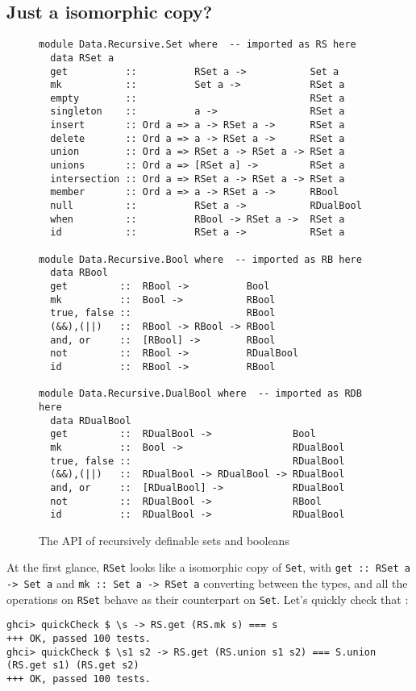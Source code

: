 \documentclass[manuscript,screen,acmsmall]{acmart}
\begin{document}
\subsection{Just a isomorphic copy?}

\begin{figure}
\begin{verbatim}
module Data.Recursive.Set where  -- imported as RS here
  data RSet a
  get          ::          RSet a ->           Set a
  mk           ::          Set a ->            RSet a
  empty        ::                              RSet a
  singleton    ::          a ->                RSet a
  insert       :: Ord a => a -> RSet a ->      RSet a
  delete       :: Ord a => a -> RSet a ->      RSet a
  union        :: Ord a => RSet a -> RSet a -> RSet a
  unions       :: Ord a => [RSet a] ->         RSet a
  intersection :: Ord a => RSet a -> RSet a -> RSet a
  member       :: Ord a => a -> RSet a ->      RBool
  null         ::          RSet a ->           RDualBool
  when         ::          RBool -> RSet a ->  RSet a
  id           ::          RSet a ->           RSet a

module Data.Recursive.Bool where  -- imported as RB here
  data RBool
  get         ::  RBool ->          Bool
  mk          ::  Bool ->           RBool
  true, false ::                    RBool
  (&&),(||)   ::  RBool -> RBool -> RBool
  and, or     ::  [RBool] ->        RBool
  not         ::  RBool ->          RDualBool
  id          ::  RBool ->          RBool

module Data.Recursive.DualBool where  -- imported as RDB here
  data RDualBool
  get         ::  RDualBool ->              Bool
  mk          ::  Bool ->                   RDualBool
  true, false ::                            RDualBool
  (&&),(||)   ::  RDualBool -> RDualBool -> RDualBool
  and, or     ::  [RDualBool] ->            RDualBool
  not         ::  RDualBool ->              RBool
  id          ::  RDualBool ->              RDualBool
\end{verbatim}
\caption{The API of recursively definable sets and booleans}\label{fig:api}
\end{figure}

At the first glance, \verb|RSet| looks like a isomorphic copy of \verb|Set|, with \verb|get :: RSet a -> Set a| and \verb|mk :: Set a -> RSet a| converting between the types, and all the operations on \verb|RSet| behave as their counterpart on \verb|Set|. Let's quickly check that \citep{quickcheck}:
\begin{verbatim}
ghci> quickCheck $ \s -> RS.get (RS.mk s) === s
+++ OK, passed 100 tests.
ghci> quickCheck $ \s1 s2 -> RS.get (RS.union s1 s2) === S.union (RS.get s1) (RS.get s2)
+++ OK, passed 100 tests.
\end{verbatim}
\end{document}
